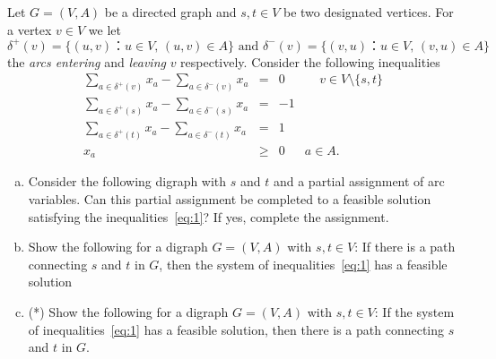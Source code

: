 \documentclass[11pt]{article}
\begin{document}
\newpage 
\problem

 Let $G = (V,A)$ be a directed graph and $s,t ∈ V$ be two designated vertices. For a vertex $v ∈ V$ we let
  \begin{displaymath}
    δ^+(v) = \{ (u,v) ： u ∈ V, \, (u,v) ∈A\} \text{ and } δ^-(v) = \{ (v,u) ： u ∈ V, \, (v,u) ∈A\}
  \end{displaymath}
  the \emph{arcs entering} and \emph{leaving} $v$ respectively.  Consider the following inequalities
  \begin{equation} 
    \begin{array}{rclc}      \displaystyle 
    ∑_{a ∈ δ^+(v) } x_a -  ∑_{a ∈ δ^-(v) } x_a & = &  0 & \, \quad v ∈ V \setminus \{s,t\} \\ \displaystyle 
      ∑_{a ∈ δ^+(s) } x_a -  ∑_{a ∈ δ^-(s) } x_a & = &  -1 & \\
      \displaystyle 
      ∑_{a ∈ δ^+(t) } x_a -  ∑_{a ∈ δ^-(t) } x_a & = &  1 & \\
      x_a &≥& 0 & a ∈A.
    \end{array}
    \label{eq:1}
  \end{equation}
  
  \begin{enumerate}[a)] 
  \item Consider the following digraph with $s$ and $t$ and a partial assignment of arc variables. Can this partial assignment be completed to a feasible solution satisfying the inequalities~\eqref{eq:1}? If yes, complete the assignment.
    \begin{center}
             
    \end{center}
\item Show the following for a digraph $G = (V,A)$ with $s,t ∈ V$: If there is a path connecting $s$ and $t$ in $G$, then the system of inequalities~\eqref{eq:1} has a feasible solution
  \item (*)  Show the following for a digraph $G = (V,A)$ with $s,t ∈ V$: If  the system of inequalities~\eqref{eq:1} has a feasible solution, then  there is a path connecting $s$ and $t$ in $G$. 
   \end{enumerate}
  
\end{document}
